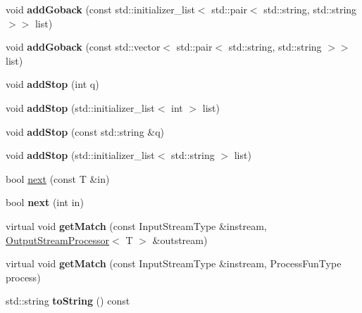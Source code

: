 \begin{DoxyCompactItemize}
\item 
\mbox{\label{classx2_1_1_determinastic_f_a_a3761a086c847df17777820e80dae2470}} 
void {\bfseries add\+Goback} (const std\+::initializer\+\_\+list$<$ std\+::pair$<$ std\+::string, std\+::string $>$$>$ list)
\item 
\mbox{\label{classx2_1_1_determinastic_f_a_a0253fbb1048b2ff90dc79b9d9379be96}} 
void {\bfseries add\+Goback} (const std\+::vector$<$ std\+::pair$<$ std\+::string, std\+::string $>$$>$ list)
\item 
\mbox{\label{classx2_1_1_determinastic_f_a_ab25d920d2d20793dda5c507d9a109649}} 
void {\bfseries add\+Stop} (int q)
\item 
\mbox{\label{classx2_1_1_determinastic_f_a_a619dbc83e0a3e33e8fd8f9199f827011}} 
void {\bfseries add\+Stop} (std\+::initializer\+\_\+list$<$ int $>$ list)
\item 
\mbox{\label{classx2_1_1_determinastic_f_a_ab6979f20952c95845a5fc55c5cd71ab3}} 
void {\bfseries add\+Stop} (const std\+::string \&q)
\item 
\mbox{\label{classx2_1_1_determinastic_f_a_ad25513f1d72fd086db1f4dba68ac632b}} 
void {\bfseries add\+Stop} (std\+::initializer\+\_\+list$<$ std\+::string $>$ list)
\item 
bool \hyperlink{classx2_1_1_determinastic_f_a_afd31af3cc87e3d372900fa62da926a69}{next} (const T \&in)
\item 
\mbox{\label{classx2_1_1_determinastic_f_a_acfec740ee6f94dfe4d522dc2224047bd}} 
bool {\bfseries next} (int in)
\item 
\mbox{\label{classx2_1_1_determinastic_f_a_a3d453ac8a55453c3f87d1cb040924497}} 
virtual void {\bfseries get\+Match} (const Input\+Stream\+Type \&instream, \hyperlink{classx2_1_1_output_stream_processor}{Output\+Stream\+Processor}$<$ T $>$ \&outstream)
\item 
\mbox{\label{classx2_1_1_determinastic_f_a_a0f2257b373cedc43e09b187650d0b949}} 
virtual void {\bfseries get\+Match} (const Input\+Stream\+Type \&instream, Process\+Fun\+Type process)
\item 
\mbox{\label{classx2_1_1_determinastic_f_a_a60140cc24c0cc9369dd485cbcb550717}} 
std\+::string {\bfseries to\+String} () const
\end{DoxyCompactItemize}
